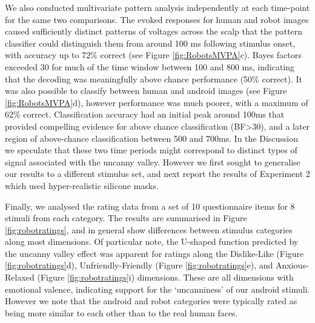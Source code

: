 \documentclass[
]{article}
\begin{document}
We also conducted multivariate pattern analysis independently at each time-point for the same two comparisons. The evoked responses for human and robot images caused sufficiently distinct patterns of voltages across the scalp that the pattern classifier could distinguish them from around 100 ms following stimulus onset, with accuracy up to 72\% correct (see Figure \ref{fig:RobotsMVPA}c). Bayes factors exceeded 30 for much of the time window between 100 and 800 ms, indicating that the decoding was meaningfully above chance performance (50\% correct). It was also possible to classify between human and android images (see Figure \ref{fig:RobotsMVPA}d), however performance was much poorer, with a maximum of 62\% correct. Classification accuracy had an initial peak around 100ms that provided compelling evidence for above chance classification (BF\textgreater30), and a later region of above-chance classification between 500 and 700ms. In the Discussion we speculate that these two time periods might correspond to distinct types of signal associated with the uncanny valley. However we first sought to generalise our results to a different stimulus set, and next report the results of Experiment 2 which used hyper-realistic silicone masks.

Finally, we analysed the rating data from a set of 10 questionnaire items for 8 stimuli from each category. The results are summarised in Figure \ref{fig:robotratings}, and in general show differences between stimulus categories along most dimensions. Of particular note, the U-shaped function predicted by the uncanny valley effect was apparent for ratings along the Dislike-Like (Figure \ref{fig:robotratings}d), Unfriendly-Friendly (Figure \ref{fig:robotratings}e), and Anxious-Relaxed (Figure \ref{fig:robotratings}i) dimensions. These are all dimensions with emotional valence, indicating support for the `uncanniness' of our android stimuli. However we note that the android and robot categories were typically rated as being more similar to each other than to the real human faces.
\end{document}
